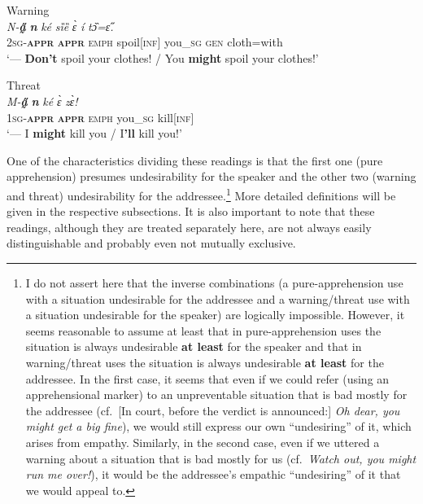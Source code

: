 \documentclass[output=paper,colorlinks,citecolor=brown]{langscibook}
\begin{document}
\begin{exe} \ex \label{ex:Fed8} \textnormal{Warning} \\
\gll \textit{N-\textbf{a̰̋}} \textit{\textbf{n{\ù}}} \textit{ké} \textit{sȉȅ} \textit{ɛ̀} \textit{í} \textit{tɔ̏=ɛ̋.} \\
\textsc{2sg-\textbf{appr}} \textbf{\textsc{appr}} \textsc{emph} spoil\textsc{[inf]} you\_\textsc{sg} \textsc{gen} cloth=with \\
 `--- \textbf{Don't} spoil your clothes! / You \textbf{might} spoil your clothes!'
\end{exe}



\ea \label{ex:Fed9} \textnormal{Threat} \\
\gll \textit{M-\textbf{a̰̋}} \textit{\textbf{n{\ù}}} \textit{ké} \textit{ɛ̀} \textit{zɛ̀!} \\
\textsc{1sg-\textbf{appr}} \textsc{\textbf{appr}} \textsc{emph} you\_\textsc{sg} kill[\textsc{inf}] \\
 `--- I \textbf{might} kill you / I\textbf{'ll} kill you!'
\z

 One of the characteristics dividing these readings is that the first one (pure apprehension) presumes undesirability for the speaker and the other two (warning and threat) undesirability for the addressee.\footnote{I do not assert here that the inverse combinations (a pure-apprehension use with a situation undesirable for the addressee and a warning\slash threat use with a situation undesirable for the speaker) are logically impossible. However, it seems reasonable to assume at least that in pure-apprehension uses the situation is always undesirable \textbf{at least} for the speaker and that in warning\slash threat uses the situation is always undesirable \textbf{at least} for the addressee. In the first case, it seems that even if we could refer (using an apprehensional marker) to an unpreventable situation that is bad mostly for the addressee (cf.\ [In court, before the verdict is announced:] \textit{Oh dear, you might get a big fine}), we would still express our own ``undesiring'' of it, which arises from empathy. Similarly, in the second case, even if we uttered a warning about a situation that is bad mostly for us (cf.\ \textit{Watch out, you might run me over!}), it would be the addressee's empathic ``undesiring'' of it that we would appeal to.} More detailed definitions will be given in the respective subsections. It is also important to note that these readings, although they are treated separately here, are not always easily distinguishable and probably even not mutually exclusive.
\end{document}
